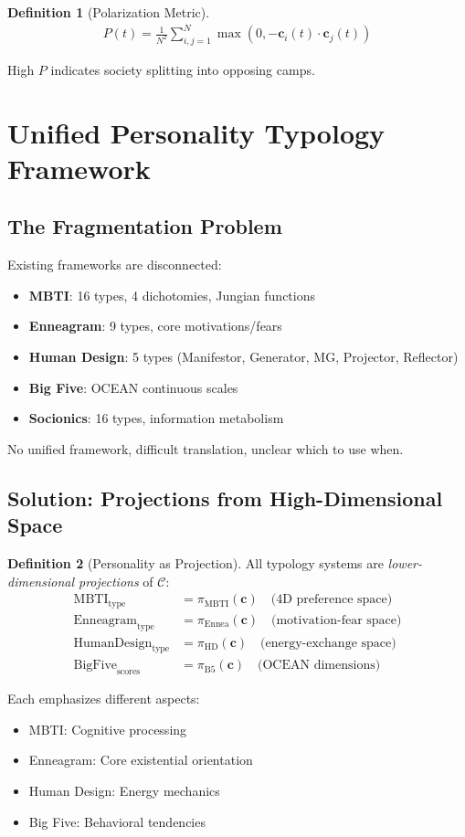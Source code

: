 \documentclass[11pt,a4paper]{article}
\theoremstyle{definition}
\newtheorem{definition}{Definition}[section]
\theoremstyle{remark}
\newcommand{\CC}{\mathcal{C}}
\newcommand{\cc}{\mathbf{c}}
\begin{document}
\begin{definition}[Polarization Metric]
\begin{align}
P(t) = \frac{1}{N^2} \sum_{i,j=1}^N \max(0, -\cc_i(t) \cdot \cc_j(t))
\end{align}

High \(P\) indicates society splitting into opposing camps.
\end{definition}

\section{Unified Personality Typology Framework}

\subsection{The Fragmentation Problem}

Existing frameworks are disconnected:
\begin{itemize}
\item \textbf{MBTI}: 16 types, 4 dichotomies, Jungian functions
\item \textbf{Enneagram}: 9 types, core motivations/fears
\item \textbf{Human Design}: 5 types (Manifestor, Generator, MG, Projector, Reflector)
\item \textbf{Big Five}: OCEAN continuous scales
\item \textbf{Socionics}: 16 types, information metabolism
\end{itemize}

No unified framework, difficult translation, unclear which to use when.

\subsection{Solution: Projections from High-Dimensional Space}

\begin{definition}[Personality as Projection]
All typology systems are \textit{lower-dimensional projections} of \(\CC\):
\begin{align}
\text{MBTI}_{\text{type}} &= \pi_{\text{MBTI}}(\cc) \quad \text{(4D preference space)} \\
\text{Enneagram}_{\text{type}} &= \pi_{\text{Ennea}}(\cc) \quad \text{(motivation-fear space)} \\
\text{HumanDesign}_{\text{type}} &= \pi_{\text{HD}}(\cc) \quad \text{(energy-exchange space)} \\
\text{BigFive}_{\text{scores}} &= \pi_{\text{B5}}(\cc) \quad \text{(OCEAN dimensions)}
\end{align}

Each emphasizes different aspects:
\begin{itemize}
\item MBTI: Cognitive processing
\item Enneagram: Core existential orientation
\item Human Design: Energy mechanics
\item Big Five: Behavioral tendencies
\end{itemize}
\end{definition}
\end{document}
